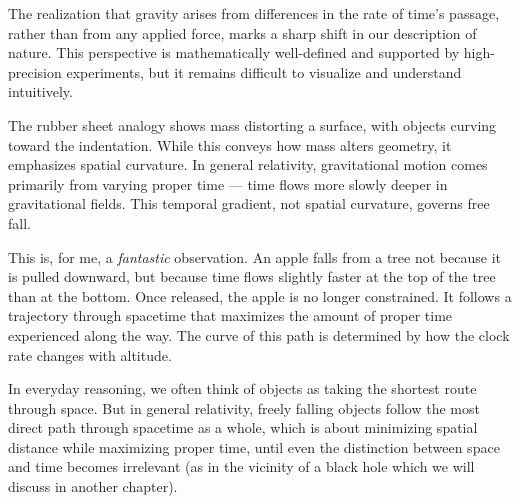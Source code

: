 \begin{commentary}

The realization that gravity arises from differences in the rate of time’s passage, rather than from any applied force, marks a sharp shift in our description of nature. This perspective is mathematically well-defined and supported by high-precision experiments, but it remains difficult to visualize and understand intuitively.

The rubber sheet analogy shows mass distorting a surface, with objects curving toward the indentation. While this conveys how mass alters geometry, it emphasizes spatial curvature. In general relativity, gravitational motion comes primarily from varying proper time — time flows more slowly deeper in gravitational fields. This temporal gradient, not spatial curvature, governs free fall.

This is, for me, a \textit{fantastic} observation. An apple falls from a tree not because it is pulled downward, but because time flows slightly faster at the top of the tree than at the bottom. Once released, the apple is no longer constrained. It follows a trajectory through spacetime that maximizes the amount of proper time experienced along the way. The curve of this path is determined by how the clock rate changes with altitude.

In everyday reasoning, we often think of objects as taking the shortest route through space. But in general relativity, freely falling objects follow the most direct path through spacetime as a whole, which is about minimizing spatial distance while maximizing proper time, until even the distinction between space and time becomes irrelevant (as in the vicinity of a black hole which we will discuss in another chapter).

\end{commentary}


